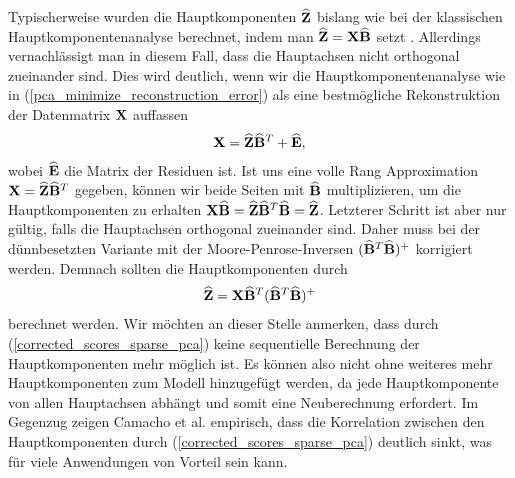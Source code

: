 Typischerweise wurden die Hauptkomponenten $\widehat{\mathbf{Z}}$ bislang wie bei der klassischen Hauptkomponentenanalyse berechnet, indem man $\widehat{\mathbf{Z}} = \mathbf{X} \widehat{\mathbf{B}}$ setzt \cite{zou_sparsepca}. Allerdings vernachlässigt man in diesem Fall, dass die Hauptachsen nicht orthogonal zueinander sind. Dies wird deutlich, wenn wir die Hauptkomponentenanalyse wie in (\ref{pca_minimize_reconstruction_error}) als eine bestmögliche Rekonstruktion der Datenmatrix $\mathbf{X}$ auffassen
\begin{align}
\label{pca_scores_loadings_model}
\mathbf{X} = \widehat{\mathbf{Z}} \widehat{\mathbf{B}}^T + \widehat{\mathbf{E}},
\end{align}
wobei $\widehat{\mathbf{E}}$ die Matrix der Residuen ist. Ist uns eine volle Rang Approximation $\mathbf{X} = \widehat{\mathbf{Z}} \widehat{\mathbf{B}}^T$ gegeben, können wir beide Seiten mit $\widehat{\mathbf{B}}$ multiplizieren, um die Hauptkomponenten zu erhalten $\mathbf{X} \widehat{\mathbf{B}} = \widehat{\mathbf{Z}} \widehat{\mathbf{B}}^T \widehat{\mathbf{B}} = \widehat{\mathbf{Z}}$. Letzterer Schritt ist aber nur gültig, falls die Hauptachsen orthogonal zueinander sind. Daher muss bei der dünnbesetzten Variante mit der Moore-Penrose-Inversen $(\widehat{\mathbf{B}}^T \widehat{\mathbf{B}})^+$ korrigiert werden. Demnach sollten die Hauptkomponenten durch
\begin{align}
\label{corrected_scores_sparse_pca}
\widehat{\mathbf{Z}} = \mathbf{X} \widehat{\mathbf{B}}^T (\widehat{\mathbf{B}}^T \widehat{\mathbf{B}})^+
\end{align}
berechnet werden. Wir möchten an dieser Stelle anmerken, dass durch (\ref{corrected_scores_sparse_pca}) keine sequentielle Berechnung der Hauptkomponenten mehr möglich ist. Es können also nicht ohne weiteres mehr Hauptkomponenten zum Modell hinzugefügt werden, da jede Hauptkomponente von allen Hauptachsen abhängt und somit eine Neuberechnung erfordert. Im Gegenzug zeigen Camacho et al. empirisch, dass die Korrelation zwischen den Hauptkomponenten durch (\ref{corrected_scores_sparse_pca}) deutlich sinkt, was für viele Anwendungen von Vorteil sein kann.

